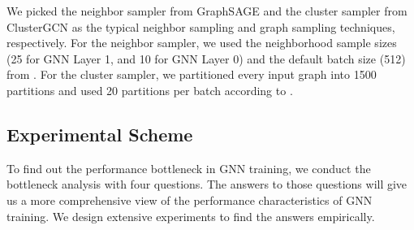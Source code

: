 We picked the neighbor sampler from GraphSAGE \cite{hamilton2017_graphsage} and the cluster sampler from ClusterGCN \cite{chiang2019_cluster_gcn} as the typical neighbor sampling and graph sampling techniques, respectively.
For the neighbor sampler, we used the neighborhood sample sizes (25 for GNN Layer 1, and 10 for GNN Layer 0) and the default batch size (512) from \cite{hamilton2017_graphsage}.
For the cluster sampler, we partitioned every input graph into 1500 partitions and used 20 partitions per batch according to \cite{chiang2019_cluster_gcn}.

\subsection{Experimental Scheme}
\label{sec:experimental_scheme}

To find out the performance bottleneck in GNN training, we conduct the bottleneck analysis with four questions.
The answers to those questions will give us a more comprehensive view of the performance characteristics of GNN training.
We design extensive experiments to find the answers empirically.
